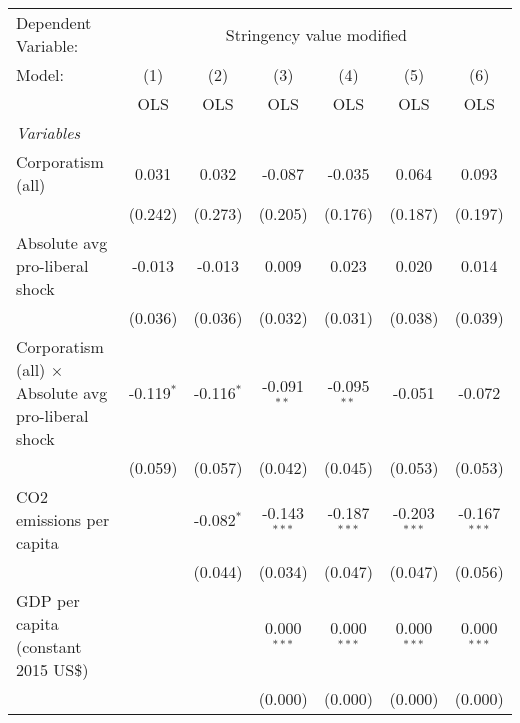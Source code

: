 
\begingroup
\centering
\begin{tabular}{lcccccc}
   \toprule
   Dependent Variable: & \multicolumn{6}{c}{Stringency value modified}\\
   Model:                                                     & (1)          & (2)          & (3)            & (4)            & (5)            & (6)\\  
                                                              &  OLS         & OLS          & OLS            & OLS            & OLS            & OLS\\  
   \midrule
   \emph{Variables}\\
   Corporatism (all)                                          & 0.031        & 0.032        & -0.087         & -0.035         & 0.064          & 0.093\\   
                                                              & (0.242)      & (0.273)      & (0.205)        & (0.176)        & (0.187)        & (0.197)\\   
   Absolute avg pro-liberal shock                             & -0.013       & -0.013       & 0.009          & 0.023          & 0.020          & 0.014\\   
                                                              & (0.036)      & (0.036)      & (0.032)        & (0.031)        & (0.038)        & (0.039)\\   
   Corporatism (all) $\times$ Absolute avg pro-liberal shock  & -0.119$^{*}$ & -0.116$^{*}$ & -0.091$^{**}$  & -0.095$^{**}$  & -0.051         & -0.072\\   
                                                              & (0.059)      & (0.057)      & (0.042)        & (0.045)        & (0.053)        & (0.053)\\   
   CO2 emissions per capita                                   &              & -0.082$^{*}$ & -0.143$^{***}$ & -0.187$^{***}$ & -0.203$^{***}$ & -0.167$^{***}$\\   
                                                              &              & (0.044)      & (0.034)        & (0.047)        & (0.047)        & (0.056)\\   
   GDP per capita (constant 2015 US\$)                        &              &              & 0.000$^{***}$  & 0.000$^{***}$  & 0.000$^{***}$  & 0.000$^{***}$\\   
                                                              &              &              & (0.000)        & (0.000)        & (0.000)        & (0.000)\\   

\end{tabular}
